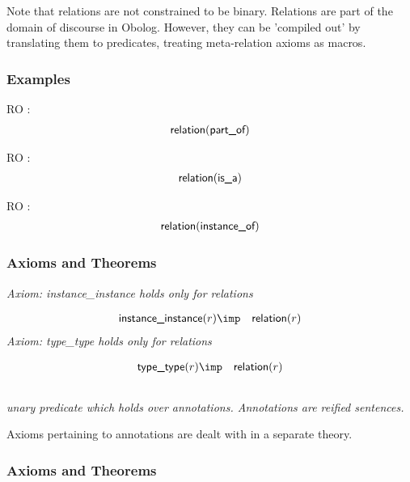 Note that relations are not constrained to be binary. Relations are part of the domain of discourse in Obolog. However, they can be 'compiled out' by translating them to predicates, treating meta-relation axioms as macros.

\subsubsection{Examples}
\begin{clist}
\item RO : \begin{eqnarray*}
 \mbox{\sf relation}( \mbox{\sf part\_of}) 
\end{eqnarray*}

\item RO : \begin{eqnarray*}
 \mbox{\sf relation}( \mbox{\sf is\_a}) 
\end{eqnarray*}

\item RO : \begin{eqnarray*}
 \mbox{\sf relation}( \mbox{\sf instance\_of}) 
\end{eqnarray*}

\end{clist}

\subsubsection{Axioms and Theorems}


\emph{Axiom: instance\_instance holds only for relations}

\begin{eqnarray*}
 \pr{instance\_instance}(r) &\imp & \pr{relation}(r) 
\end{eqnarray*}
\emph{Axiom: type\_type holds only for relations}

\begin{eqnarray*}
 \pr{type\_type}(r) &\imp & \pr{relation}(r) 
\end{eqnarray*}

\subsection{ }
\emph{unary predicate which holds over annotations. Annotations are reified sentences.}

Axioms pertaining to annotations are dealt with in a separate theory.

\subsubsection{Axioms and Theorems}




